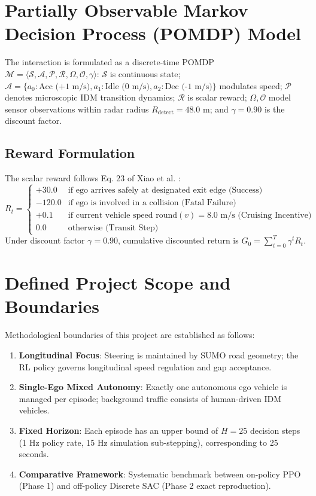 \vspace{-0.2cm}
\section{Partially Observable Markov Decision Process (POMDP) Model}
The interaction is formulated as a discrete-time POMDP $\mathcal{M} = \langle \mathcal{S}, \mathcal{A}, \mathcal{P}, \mathcal{R}, \Omega, \mathcal{O}, \gamma \rangle$: $\mathcal{S}$ is continuous state; $\mathcal{A} = \{a_0: \text{Acc (+1 m/s)}, a_1: \text{Idle (0 m/s)}, a_2: \text{Dec (-1 m/s)}\}$ modulates speed; $\mathcal{P}$ denotes microscopic IDM transition dynamics; $\mathcal{R}$ is scalar reward; $\Omega, \mathcal{O}$ model sensor observations within radar radius $R_{\text{detect}} = 48.0$ m; and $\gamma = 0.90$ is the discount factor.

\subsection{Reward Formulation}
The scalar reward follows Eq. 23 of Xiao et al. \cite{xiao2024decision}:
\begin{equation}
    R_t = \begin{cases}
        +30.0 & \text{if ego arrives safely at designated exit edge (Success)} \\
        -120.0 & \text{if ego is involved in a collision (Fatal Failure)} \\
        +0.1 & \text{if current vehicle speed } \text{round}(v) = 8.0 \text{ m/s (Cruising Incentive)} \\
        0.0 & \text{otherwise (Transit Step)}
    \end{cases}
    \label{eq:reward}
\end{equation}
Under discount factor $\gamma = 0.90$, cumulative discounted return is $G_0 = \sum_{t=0}^{T} \gamma^t R_t$.

\vspace{-0.2cm}
\section{Defined Project Scope and Boundaries}
Methodological boundaries of this project are established as follows:
\begin{enumerate}
    \setlength{\itemsep}{0pt}\setlength{\parskip}{0pt}
    \item \textbf{Longitudinal Focus}: Steering is maintained by SUMO road geometry; the RL policy governs longitudinal speed regulation and gap acceptance.
    \item \textbf{Single-Ego Mixed Autonomy}: Exactly one autonomous ego vehicle is managed per episode; background traffic consists of human-driven IDM vehicles.
    \item \textbf{Fixed Horizon}: Each episode has an upper bound of $H = 25$ decision steps (1 Hz policy rate, 15 Hz simulation sub-stepping), corresponding to 25 seconds.
    \item \textbf{Comparative Framework}: Systematic benchmark between on-policy PPO (Phase 1) and off-policy Discrete SAC (Phase 2 exact reproduction).
\end{enumerate}

